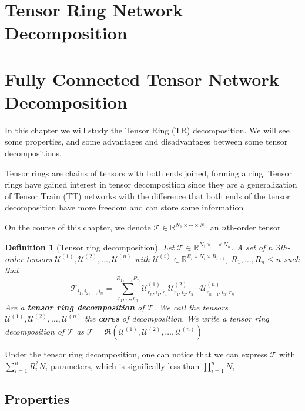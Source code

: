 \documentclass[11pt,a4paper,openright,oneside]{book}
\numberwithin{equation}{section}
\newtheorem{defn0}{Definition}[chapter]
\newenvironment{definition}{ \begin{defn0}}{\end{defn0}}
\begin{document}
\section{Tensor Ring Network Decomposition}
\section{Fully Connected Tensor Network Decomposition}

In this chapter we will study the Tensor Ring (TR) decomposition. We will see some properties, and some advantages
and disadvantages between some tensor decompositions.

Tensor rings are chains of tensors with both ends joined, forming a ring. Tensor rings
have gained interest in tensor decomposition since they are a generalization of Tensor Train (TT) networks with
the difference that both ends of the tensor decomposition have more freedom and can store some information \cite{wangWideCompressionTensor2018}

On the course of this chapter, we denote $\mathcal{T} \in \mathbb{R}^{N_1 \times \cdots \times N_n}$ an $n$th-order tensor

\begin{definition}[Tensor ring decomposition]
    Let $\mathcal{T} \in \mathbb{R}^{N_1 \times \cdots \times N_n}$. A set of $n$ $3$th-order tensors $\mathcal{U}^{(1)}, \mathcal{U}^{(2)}, \dots, \mathcal{U}^{(n)}$
    with $\mathcal{U}^{(i)} \in \mathbb{R}^{R_i \times N_i \times R_{i+1}}$, $R_1, \dots, R_n \leqslant n$ such that
    $$\mathcal{T}_{i_1, i_2, \dots, i_n} = \sum_{r_1, \dots, r_n}^{R_1, \dots, R_n} \mathcal{U}_{r_n, i_1, r_1}^{(1)} \mathcal{U}_{r_1, i_2, r_2}^{(2)} \cdots \mathcal{U}_{r_{n-1}, i_n, r_n}^{(n)}$$
    Are a \textbf{tensor ring decomposition} of $\mathcal{T}$. We call the tensors $\mathcal{U}^{(1)}, \mathcal{U}^{(2)}, \dots, \mathcal{U}^{(n)}$ the \textbf{cores} of 
    decomposition. We write a tensor ring decomposition of $\mathcal{T}$ as $\mathcal{T} = \mathfrak{R}(\mathcal{U}^{(1)}, \mathcal{U}^{(2)}, \dots, \mathcal{U}^{(n)})$

\end{definition}
Under the tensor ring decomposition, one can notice that we can express $\mathcal{T}$ with $\sum_{i=1}^n R_i^2 N_i$ parameters,
which is significally less than $\prod_{i=1}^n N_i$

\subsection{Properties}
\end{document}

